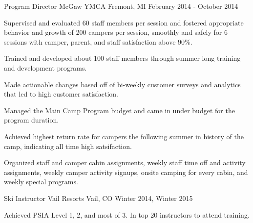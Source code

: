 

\begin{cventries}

  \cventry
    {Program Director} %
    {McGaw YMCA} %
    {Fremont, MI} %
    {February 2014 - October 2014} %
    {
      \begin{cvitems} %
        \item {Supervised and evaluated 60 staff members per session and fostered appropriate behavior and growth of 200 campers per session, smoothly and safely for 6 sessions with camper, parent, and staff satisfaction above 90\%.}
        \item {Trained and developed about 100 staff members through summer long training and development programs.}
        \item {Made actionable changes based off of bi-weekly customer surveys and analytics that led to high customer satisfaction.}
        \item {Managed the Main Camp Program budget and came in under budget for the program duration.}
        \item {Achieved highest return rate for campers the following summer in history of the camp, indicating all time high satsifaction.}
        \item {Organized staff and camper cabin assignments, weekly staff time off and activity assignments, weekly camper activity signups, onsite camping for every cabin, and weekly special programs.}
      \end{cvitems}
    }
    
 \cventry
    {Ski Instructor} %
    {Vail Resorts} %
    {Vail, CO} %
    {Winter 2014, Winter 2015} %
    {
      \begin{cvitems} %
        \item {Achieved PSIA Level 1, 2, and most of 3. In top 20 instructors to attend training.}
      \end{cvitems}
    }



\end{cventries}
